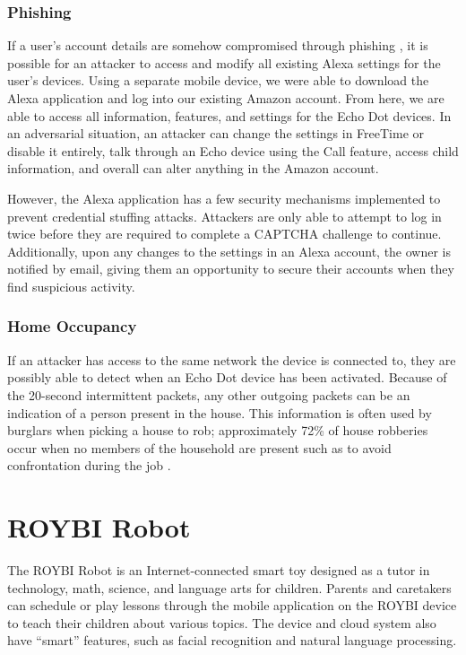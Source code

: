 \documentclass[12pt]{ucthesis}
\begin{document}
\subsubsection{Phishing}
If a user's account details are somehow compromised through phishing \cite{phishing}, it is possible for an attacker to access and modify all existing Alexa settings for the user's devices. Using a separate mobile device, we were able to download the Alexa application and log into our existing Amazon account. From here, we are able to access all information, features, and settings for the Echo Dot devices. In an adversarial situation, an attacker can change the settings in FreeTime or disable it entirely, talk through an Echo device using the Call feature, access child information, and overall can alter anything in the Amazon account.  

However, the Alexa application has a few security mechanisms implemented to prevent credential stuffing attacks. Attackers are only able to attempt to log in twice before they are required to complete a CAPTCHA \cite{captcha} challenge to continue. Additionally, upon any changes to the settings in an Alexa account, the owner is notified by email, giving them an opportunity to secure their accounts when they find suspicious activity.

\subsubsection{Home Occupancy}
If an attacker has access to the same network the device is connected to, they are possibly able to detect when an Echo Dot device has been activated. Because of the 20-second intermittent packets, any other outgoing packets can be an indication of a person present in the house. This information is often used by burglars when picking a house to rob; approximately 72\% of house robberies occur when no members of the household are present such as to avoid confrontation during the job \cite{burglar}. 

\section{ROYBI Robot}
The ROYBI Robot is an Internet-connected smart toy designed as a tutor in technology, math, science, and language arts for children. Parents and caretakers can schedule or play lessons through the mobile application on the ROYBI device to teach their children about various topics. The device and cloud system also have ``smart'' features, such as facial recognition and natural language processing.
\end{document}
